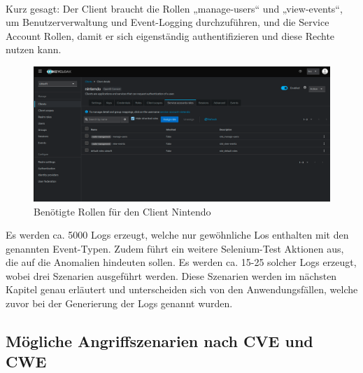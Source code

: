 \documentclass[a4paper,12pt]{article}
\begin{document}
	\\[0.5em]
	Kurz gesagt: Der Client braucht die Rollen „manage-users“ und „view-events“, um Benutzerverwaltung und Event-Logging durchzuführen, und die Service Account Rollen, damit er sich eigenständig authentifizieren und diese Rechte nutzen kann.
	\\[0.5em]
	\begin{figure}[H]
		\centering
		\includegraphics[width=0.9\linewidth]{screenshot012}
		\caption{Benötigte Rollen für den Client Nintendo}
		\label{fig:screenshot012}
	\end{figure}
	
	Es werden ca. 5000 Logs erzeugt, welche nur gewöhnliche Los enthalten mit den genannten Event-Typen. Zudem führt ein weitere Selenium-Test Aktionen aus, die auf die Anomalien hindeuten sollen. Es werden ca. 15-25 solcher Logs erzeugt, wobei drei Szenarien ausgeführt werden. Diese Szenarien werden im nächsten Kapitel genau erläutert und unterscheiden sich von den Anwendungsfällen, welche zuvor bei der Generierung der Logs genannt wurden.
	\\[0.5em]
	
	\subsection{Mögliche Angriffszenarien nach CVE und CWE}
	
\end{document}
